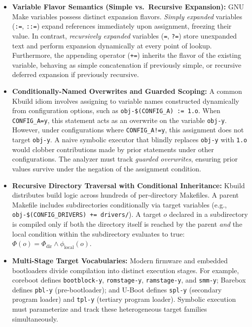 \documentclass[acmsmall,screen,review]{acmart}
\begin{document}
\begin{itemize}
\item \textbf{Variable Flavor Semantics (Simple vs.\ Recursive Expansion):} GNU Make variables possess distinct expansion flavors. \emph{Simply expanded} variables (\texttt{:=}, \texttt{::=}) expand references immediately upon assignment, freezing their value. In contrast, \emph{recursively expanded} variables (\texttt{=}, \texttt{?=}) store unexpanded text and perform expansion dynamically at every point of lookup. Furthermore, the appending operator (\texttt{+=}) inherits the flavor of the existing variable, behaving as simple concatenation if previously simple, or recursive deferred expansion if previously recursive.
\item \textbf{Conditionally-Named Overwrites and Guarded Scoping:} A common Kbuild idiom involves assigning to variable names constructed dynamically from configuration options, such as \texttt{obj-\$(CONFIG\_A) := 1.o}. When \texttt{CONFIG\_A=y}, this statement acts as an overwrite on the variable \texttt{obj-y}. However, under configurations where \texttt{CONFIG\_A!=y}, this assignment does not target \texttt{obj-y}. A naive symbolic executor that blindly replaces \texttt{obj-y} with \texttt{1.o} would clobber contributions made by prior statements under other configurations. The analyzer must track \emph{guarded overwrites}, ensuring prior values survive under the negation of the assignment condition.
\item \textbf{Recursive Directory Traversal with Conditional Inheritance:} Kbuild distributes build logic across hundreds of per-directory Makefiles. A parent Makefile includes subdirectories conditionally via target variables (e.g., \texttt{obj-\$(CONFIG\_DRIVERS) += drivers/}). A target $o$ declared in a subdirectory is compiled only if both the directory itself is reached by the parent \emph{and} the local condition within the subdirectory evaluates to true: $\Phi(o) = \Phi_{\text{dir}} \wedge \phi_{\text{local}}(o)$.
\item \textbf{Multi-Stage Target Vocabularies:} Modern firmware and embedded bootloaders divide compilation into distinct execution stages. For example, coreboot defines \texttt{bootblock-y}, \texttt{romstage-y}, \texttt{ramstage-y}, and \texttt{smm-y}; Barebox defines \texttt{pbl-y} (pre-bootloader); and U-Boot defines \texttt{spl-y} (secondary program loader) and \texttt{tpl-y} (tertiary program loader). Symbolic execution must parameterize and track these heterogeneous target families simultaneously.
\end{itemize}
\end{document}
